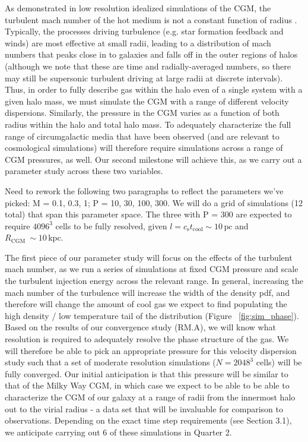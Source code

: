 \documentclass[11pt,letterpaper,english]{article}
\begin{document}
As demonstrated in low resolution idealized simulations of the CGM, the turbulent mach number of the hot medium is not a constant function of radius \cite{Fielding17}. Typically, the processes driving turbulence (e.g. star formation feedback and winds) are most effective at small radii, leading to a distribution of mach numbers that peaks close in to galaxies and falls off in the outer regions of halos (although we note that these are time and radially-averaged numbers, so there may still be supersonic turbulent driving at large radii at discrete intervals). Thus, in order to fully describe gas within the halo even of a single system with a given halo mass, we must simulate the CGM with a range of different velocity dispersions. Similarly, the pressure in the CGM varies as a function of both radius within the halo and total halo mass. To adequately characterize the full range of circumgalactic media that have been observed (and are relevant to cosmological simulations) will therefore require simulations across a range of CGM pressures, as well. Our second milestone will achieve this, as we carry out a parameter study across these two variables.

Need to rework the following two paragraphs to reflect the parameters we've picked: M = 0.1, 0.3, 1; P = 10, 30, 100, 300. We will do a grid of simulations (12 total) that span this parameter space. The three with P = 300 are expected to require $4096^3$ cells to be fully resolved, given $l = c_\mathrm{s} t_\mathrm{cool} \sim 10\,\mathrm{pc}$ and $R_\mathrm{CGM} ~\sim10\,\mathrm{kpc}$.

The first piece of our parameter study will focus on the effects of the turbulent mach number, as we run a series of simulations at fixed CGM pressure and scale the turbulent injection energy across the relevant range. In general, increasing the mach number of the turbulence will increase the width of the density pdf, and therefore will change the amount of cool gas we expect to find populating the high density / low temperature tail of the distribution (Figure ~\ref{fig:sim_phase}). Based on the results of our convergence study (RM.A), we will know what resolution is required to adequately resolve the phase structure of the gas. We will therefore be able to pick an appropriate pressure for this velocity dispersion study such that a set of moderate resolution simulations ($N = 2048^3$ cells) will be fully converged. Our initial anticipation is that this pressure will be similar to that of the Milky Way CGM, in which case we expect to be able to be able to characterize the CGM of our galaxy at a range of radii from the innermost halo out to the virial radius - a data set that will be invaluable for comparison to observations. Depending on the exact time step requirements (see Section 3.1), we anticipate carrying out 6 of these simulations in Quarter 2.
\end{document}
